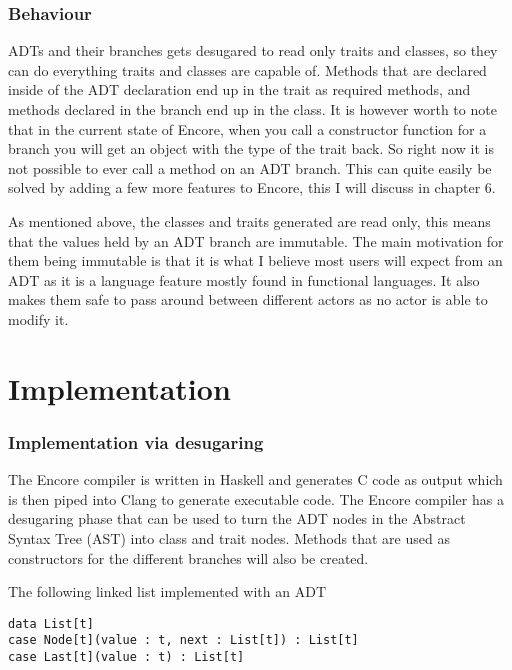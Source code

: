 \documentclass[10pt]{report}
\begin{document}
{\subsection{Behaviour}
\label{ch:behaviour}
\par{ADTs and their branches gets desugared to read only traits and classes, so they can do everything traits and classes are capable of. Methods that are declared inside of the ADT declaration end up in the trait as required methods, and methods declared in the branch end up in the class. It is however worth to note that in the current state of Encore, when you call a constructor function for a branch you will get an object with the type of the trait back. So right now it is not possible to ever call a method on an ADT branch. This can quite easily be solved by adding a few more features to Encore, this I will discuss in chapter 6.}
\par{As mentioned above, the classes and traits generated are read only, this means that the values held by an ADT branch are immutable.  The main motivation for them being immutable is that it is what I believe most users will expect from an ADT as it is a language feature mostly found in functional languages. It also makes them safe to pass around between different actors as no actor is able to modify it.}
\chapter{Implementation}

\subsection{Implementation via desugaring}
\par{The Encore compiler is written in Haskell and generates C code as output which is then piped into Clang to generate executable code. The Encore compiler has a desugaring phase that can be used to turn the ADT nodes in the Abstract Syntax Tree (AST) into class and trait nodes. Methods that are used as constructors for the different branches will also be created.}
\par{The following linked list implemented with an ADT}

\begin{lstlisting}[language=encore,caption={Linked list before it has been desugared}]
data List[t]
case Node[t](value : t, next : List[t]) : List[t]
case Last[t](value : t) : List[t]
\end{lstlisting}

}
\end{document}
